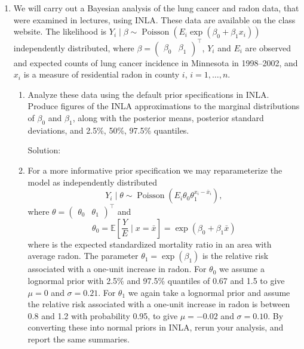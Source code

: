 \documentclass[letterpaper,11pt]{article}
\begin{document}
\begin{enumerate}
\begin{enumerate}
\begin{enumerate}
    \item 
    \item 
    \end{enumerate}
  \end{enumerate}
\item We will carry out a Bayesian analysis of the lung cancer and radon data,
  that were examined in lectures, using INLA. These data are available on the
  class website. The likelihood is
  $Y_i \mid \beta \sim \operatorname{Poisson}\left (E_i\exp\left(\beta_0 +
      \beta_1x_i\right)\right)$ independently distributed, where
  $\beta = \begin{pmatrix}\beta_0 & \beta_1\end{pmatrix}^\intercal$, $Y_i$ and
  $E_i$ are observed and expected counts of lung cancer incidence in Minnesota
  in 1998--2002, and $x_i$ is a measure of residential radon in county $i$,
  $i = 1,\ldots,n$.

  \begin{enumerate}
  \item Analyze these data using the default prior specifications in
    INLA. Produce figures of the INLA approximations to the marginal
    distributions of $\beta_0$ and $\beta_1$, along with the posterior means,
    posterior standard deviations, and 2.5\%, 50\%, 97.5\% quantiles.

    \begin{description}
    \item[Solution:] 
    \end{description}
  \item For a more informative prior specification we may reparameterize the
    model as independently distributed
    \begin{equation}
      Y_i \mid \theta \sim \operatorname{Poisson}\left(
        E_i\theta_0\theta_1^{x_i - \bar{x}_i}
      \right),
    \end{equation}
    where
    $\theta = \begin{pmatrix} \theta_0 & \theta_1\end{pmatrix}^\intercal$ and
    \begin{equation}
      \theta_0 = \mathbb{E}\left[\frac{Y}{E} \mid x = \bar{x}\right]
      = \exp\left(\beta_0 + \beta_1\bar{x}\right)
    \end{equation}
    where is the expected standardized mortality ratio in an area with average
    radon. The parameter $\theta_1 = \exp\left(\beta_1\right)$ is the relative
    risk associated with a one-unit increase in radon.  For $\theta_0$ we assume
    a lognormal prior with 2.5\% and 97.5\% quantiles of 0.67 and 1.5 to give
    $\mu = 0$ and $\sigma = 0.21$. For $\theta_1$ we again take a lognormal
    prior and assume the relative risk associated with a one-unit increase in
    radon is between 0.8 and 1.2 with probability 0.95, to give $\mu = -0.02$
    and $\sigma = 0.10$. By converting these into normal priors in INLA, rerun
    your analysis, and report the same summaries.


\end{enumerate}
\end{enumerate}
\end{document}
